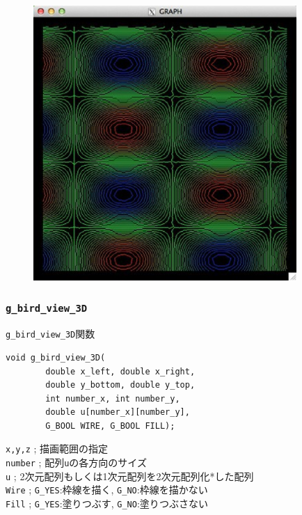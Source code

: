 \documentclass[platex,a4paper,12pt]{jsarticle}%
\begin{document}
\begin{figure}[htb]
\centering
	\includegraphics[width=100mm]{Canvas_g_contln.eps}
\end{figure}




\clearpage
\subsubsection{\texttt{g\_bird\_view\_3D}}

\begin{itembox}[l]{\texttt{g\_bird\_view\_3D}関数}
\begin{verbatim}
void g_bird_view_3D(
        double x_left, double x_right, 
        double y_bottom, double y_top,
        int number_x, int number_y,
        double u[number_x][number_y],
        G_BOOL WIRE, G_BOOL FILL);
\end{verbatim}
\verb|x,y,z| ; 描画範囲の指定\\
\verb|number| ; 配列\verb|u|の各方向のサイズ\\
\verb|u| ; 2次元配列もしくは1次元配列を2次元配列化*した配列\\
\verb|Wire| ; \verb|G_YES|:枠線を描く, \verb|G_NO|:枠線を描かない \\
\verb|Fill| ; \verb|G_YES|:塗りつぶす, \verb|G_NO|:塗りつぶさない 
\end{itembox}
\end{document}
